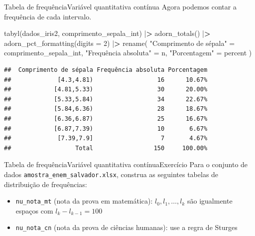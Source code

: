 \documentclass[
  10pt,
  ignorenonframetext,
]{beamer}
\newenvironment{Shaded}{}{}
\newcommand{\DataTypeTok}[1]{#1}
\newcommand{\DecValTok}[1]{#1}
\newcommand{\ErrorTok}[1]{\textcolor[rgb]{1.00,0.00,0.00}{\textbf{#1}}}
\newcommand{\KeywordTok}[1]{\textcolor[rgb]{0.00,0.00,1.00}{#1}}
\newcommand{\NormalTok}[1]{#1}
\newcommand{\OperatorTok}[1]{#1}
\newcommand{\StringTok}[1]{\textcolor[rgb]{0.00,0.50,0.50}{#1}}
\providecommand{\tightlist}{%
  \setlength{\itemsep}{0pt}\setlength{\parskip}{0pt}}
\begin{document}
\begin{frame}[fragile]{Tabela de frequência\newline Variável
quantitativa contínua}
\protect\hypertarget{tabela-de-frequuxeanciavariuxe1vel-quantitativa-contuxednua-2}{}
Agora podemos contar a frequência de cada intervalo.

\begin{Shaded}
\begin{Highlighting}[]
\KeywordTok{tabyl}\NormalTok{(dados\_iris2, comprimento\_sepala\_int) }\OperatorTok{|}\ErrorTok{\textgreater{}}
\StringTok{  }\KeywordTok{adorn\_totals}\NormalTok{() }\OperatorTok{|}\ErrorTok{\textgreater{}}
\StringTok{  }\KeywordTok{adorn\_pct\_formatting}\NormalTok{(}\DataTypeTok{digits =} \DecValTok{2}\NormalTok{) }\OperatorTok{|}\ErrorTok{\textgreater{}}
\StringTok{  }\KeywordTok{rename}\NormalTok{(}
    \StringTok{"Comprimento de sépala"}\NormalTok{ =}\StringTok{ }\NormalTok{comprimento\_sepala\_int,}
    \StringTok{"Frequência absoluta"}\NormalTok{ =}\StringTok{ }\NormalTok{n,}
    \StringTok{"Porcentagem"}\NormalTok{ =}\StringTok{ }\NormalTok{percent}
\NormalTok{  )}
\end{Highlighting}
\end{Shaded}
\end{frame}

\begin{frame}[fragile]
\begin{verbatim}
##  Comprimento de sépala Frequência absoluta Porcentagem
##             [4.3,4.81)                  16      10.67%
##            [4.81,5.33)                  30      20.00%
##            [5.33,5.84)                  34      22.67%
##            [5.84,6.36)                  28      18.67%
##            [6.36,6.87)                  25      16.67%
##            [6.87,7.39)                  10       6.67%
##             [7.39,7.9]                   7       4.67%
##                  Total                 150     100.00%
\end{verbatim}
\end{frame}

\begin{frame}[fragile]{Tabela de frequência\newline Variável
quantitativa contínua\newline Exercício}
\protect\hypertarget{tabela-de-frequuxeanciavariuxe1vel-quantitativa-contuxednuaexercuxedcio}{}
Para o conjunto de dados \texttt{amostra\_enem\_salvador.xlsx}, construa
as seguintes tabelas de distribuição de frequências:

\begin{itemize}
\tightlist
\item
  \texttt{nu\_nota\_mt} (nota da prova em matemática):
  \(l_0, l_1, \dots, l_k\) são igualmente espaços com
  \(l_k - l_{k-1}=100\)
\item
  \texttt{nu\_nota\_cn} (nota da prova de ciências humanas): use a regra
  de Sturges
\end{itemize}
\end{frame}
\end{document}
